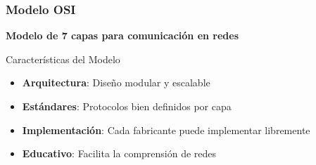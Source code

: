 \documentclass[aspectratio=169]{beamer}
\begin{document}
            \begin{frame}
            \frametitle{Modelo OSI}
            
            \begin{center}
            \Large \textbf{Modelo de 7 capas para comunicación en redes}
            \end{center}
            
            
            \begin{block}{Características del Modelo}
            \begin{itemize}
            \item \textbf{Arquitectura}: Diseño modular y escalable
            \item \textbf{Estándares}: Protocolos bien definidos por capa
            \item \textbf{Implementación}: Cada fabricante puede implementar libremente
            \item \textbf{Educativo}: Facilita la comprensión de redes
            \end{itemize}
            \end{block}
            \end{frame}
            
\end{document}
